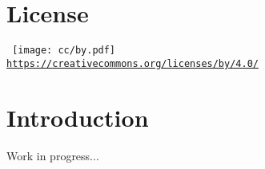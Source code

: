
\thispagestyle{empty} %
\flushbottom %
\maketitle %



\section*{License}

    \scriptsize\noindent%
    \begin{minipage}{\columnwidth}
        \centering\tt
        \texttt{[image: cc/by.pdf]}\\[0.5\smallskipamount]
        {\scriptsize\url{https://creativecommons.org/licenses/by/4.0/}}
    \end{minipage}
    \normalsize



\tableofcontents



\section{Introduction}

    Work in progress...

